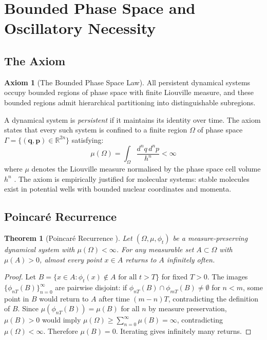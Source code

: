 \documentclass[11pt,twocolumn,a4paper]{article}
\newtheorem{theorem}{Theorem}[section]
\theoremstyle{definition}
\newtheorem{axiom}{Axiom}
\theoremstyle{remark}
\newcommand{\Real}{\mathbb{R}}
\begin{document}
\section{Bounded Phase Space and Oscillatory Necessity}
\label{sec:bounded_phase_space}

\subsection{The Axiom}

\begin{axiom}[The Bounded Phase Space Law]
\label{ax:bpsl}
All persistent dynamical systems occupy bounded regions of phase space with finite Liouville measure, and these bounded regions admit hierarchical partitioning into distinguishable subregions.
\end{axiom}

A dynamical system is \emph{persistent} if it maintains its identity over time. The axiom states that every such system is confined to a finite region $\Omega$ of phase space $\Gamma = \{(\mathbf{q}, \mathbf{p}) \in \Real^{2n}\}$ satisfying:
\begin{equation}
\mu(\Omega) = \int_\Omega \frac{d^n q \, d^n p}{h^n} < \infty
\label{eq:finite_measure}
\end{equation}
where $\mu$ denotes the Liouville measure normalised by the phase space cell volume $h^n$ \citep{planck1901}. The axiom is empirically justified for molecular systems: stable molecules exist in potential wells with bounded nuclear coordinates and momenta.

\subsection{Poincar\'e Recurrence}

\begin{theorem}[Poincar\'e Recurrence {\citep{poincare1890}}]
\label{thm:poincare}
Let $(\Omega, \mu, \phi_t)$ be a measure-preserving dynamical system with $\mu(\Omega) < \infty$. For any measurable set $A \subset \Omega$ with $\mu(A) > 0$, almost every point $x \in A$ returns to $A$ infinitely often.
\end{theorem}

\begin{proof}
Let $B = \{x \in A : \phi_t(x) \notin A \text{ for all } t > T\}$ for fixed $T > 0$. The images $\{\phi_{nT}(B)\}_{n=0}^\infty$ are pairwise disjoint: if $\phi_{nT}(B) \cap \phi_{mT}(B) \neq \emptyset$ for $n < m$, some point in $B$ would return to $A$ after time $(m-n)T$, contradicting the definition of $B$. Since $\mu(\phi_{nT}(B)) = \mu(B)$ for all $n$ by measure preservation, $\mu(B) > 0$ would imply $\mu(\Omega) \geq \sum_{n=0}^\infty \mu(B) = \infty$, contradicting $\mu(\Omega) < \infty$. Therefore $\mu(B) = 0$. Iterating gives infinitely many returns.
\end{proof}
\end{document}
